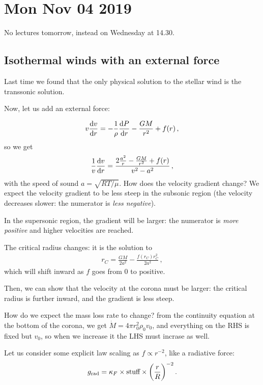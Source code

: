 \documentclass[main.tex]{subfiles}
\begin{document}
\section*{Mon Nov 04 2019}

No lectures tomorrow, instead on Wednesday at 14.30.

\subsection{Isothermal winds with an external force}

Last time we found that the only physical solution to the stellar wind is the transsonic solution.

Now, let us add an external force:

%
\begin{align}
  v \dv{v}{r} = - \frac{1}{\rho } \dv{P}{r} - \frac{GM}{r^2} + f(r)
\,,
\end{align}
%
so we get 
%
\begin{align}
  \frac{1}{v} \dv{v}{r} = \frac{2 \frac{a^2}{r} - \frac{GM}{r^2} + f(r)}{v^2 - a^2}
\,,
\end{align}
%
with the speed of sound \(a = \sqrt{RT / \mu } \). How does the velocity gradient change?
We expect the velocity gradient to be less steep in the subsonic region (the velocity decreases slower: the numerator is \emph{less negative}).

In the supersonic region, the gradient will be larger: the numerator is \emph{more positive} and higher velocities are reached.

The critical radius changes: it is the solution to 
%
\begin{align}
  r_C = \frac{GM}{2 a^2} - \frac{f(r_C) r_C^2}{2 a^2}
\,,
\end{align}
%
which will shift inward as \(f\) goes from 0 to positive.

Then, we can show that the velocity at the corona must be larger: the critical radius is further inward, and the gradient is less steep.

How do we expect the mass loss rate to change? from the continuity equation at the bottom of the corona, we get \(\dot{M} = 4 \pi r_0^2 \rho_0 v_0 \), and everything on the RHS is fixed but \(v_0 \), so when we increase it the LHS must incrase as well.

Let us consider some explicit law scaling as \(f \propto r^{-2}\), like a radiative force: 
%
\begin{align}
  g _{\text{rad}} = \kappa_F \times \text{stuff} \times \qty(\frac{r}{R})^{-2}
\,.
\end{align}
\end{document}
